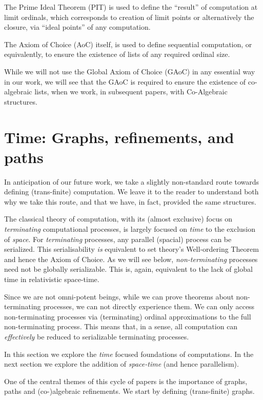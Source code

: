 \documentclass[a4paper,openany]{amsart}
\begin{document}
The Prime Ideal Theorem (PIT) is used to define the ``result'' of computation at
limit ordinals, which corresponds to creation of limit points or alternatively
the closure, via ``ideal points'' of any computation.

The Axiom of Choice (AoC) itself, is used to define sequential computation, or
equivalently, to ensure the existence of lists of any required ordinal size.

While we will not use the Global Axiom of Choice (GAoC) in any essential way in
our work, we will see that the GAoC is required to ensure the existence of
co-algebraic lists, when we work, in subsequent papers, with Co-Algebraic
structures.

\section{Time: Graphs, refinements, and paths}

In anticipation of our future work, we take a slightly non-standard route towards defining
(trans-finite) computation. We leave it to the reader to understand both why we take
this route, and that we have, in fact, provided the same structures.

The classical theory of computation, with its (almost exclusive) focus on
\emph{terminating} computational processes, is largely focused on \emph{time} to the
exclusion of \emph{space}. For \emph{terminating} processes, any parallel (spacial)
process can be serialized. This serialisability \emph{is} equivalent to set theory's
Well-ordering Theorem and hence the Axiom of Choice. As we will see below,
\emph{non-terminating} processes need not be globally serializable. This is, again,
equivalent to the lack of global time in relativistic space-time.

Since we are not omni-potent beings, while we can prove theorems about non-terminating 
processes, we can not directly experience them. We can only access non-terminating processes 
via (terminating) ordinal approximations to the full non-terminating process. This means 
that, in a sense, all computation can \emph{effectively} be reduced to serializable 
terminating processes. 

In this section we explore the \emph{time} focused foundations of computations. In the next 
section we explore the addition of \emph{space-time} (and hence parallelism).

One of the central themes of this cycle of papers is the importance of graphs, paths and
(co-)algebraic refinements. We start by defining (trans-finite) graphs.
\end{document}
